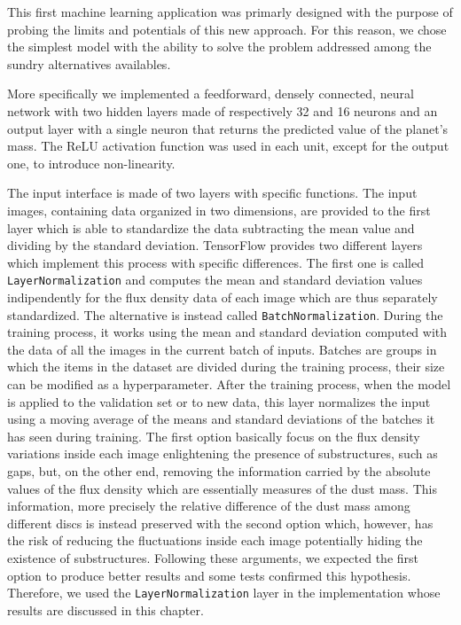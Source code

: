 \documentclass[a4paper,10pt]{report}
\begin{document}
This first machine learning application was primarly designed with the purpose of probing the limits and potentials
of this new approach. For this reason, we chose the simplest model with the ability to solve the problem addressed among the
sundry alternatives availables.

More specifically we implemented a feedforward, densely connected, neural network with two hidden layers
made of respectively 32 and 16 neurons and an output layer with a single neuron that returns the predicted value of the planet's mass.
The ReLU activation function was used in each unit, except for the output one, to introduce non-linearity.

The input interface is made of two layers with specific functions.
The input images, containing data organized in two dimensions, are provided to the first layer which is able to standardize the data 
subtracting the mean value and dividing by the standard deviation.
TensorFlow provides two different layers which implement this process with specific differences.
The first one is called \lstinline{LayerNormalization} and computes the mean and standard deviation
values indipendently for the flux density data of each image which are thus separately
standardized.
The alternative is instead called \lstinline{BatchNormalization}. During the training process, it works
using the mean and standard deviation computed with the data of all the images in the current batch of inputs. 
Batches are groups in which the items in the dataset are divided during 
the training process, their size can be modified as a hyperparameter.
After the training process, when the model is applied to the validation set or to new data, 
this layer normalizes the input using a moving average of the means and standard deviations of the batches it has seen during training.
The first option basically focus on the flux density variations inside each image enlightening the presence of substructures, such as gaps, 
but, on the other end, removing the information carried by the absolute values of the flux density which are essentially measures
of the dust mass. This information, more precisely the relative difference of the dust mass among different discs is instead preserved 
with the second option which, however, has the risk of reducing the fluctuations inside each image potentially hiding the existence
of substructures.
Following these arguments, we expected the first option to produce better results and some tests confirmed this hypothesis.
Therefore, we used the \lstinline{LayerNormalization} layer in the implementation whose results are discussed in this chapter.
\end{document}
